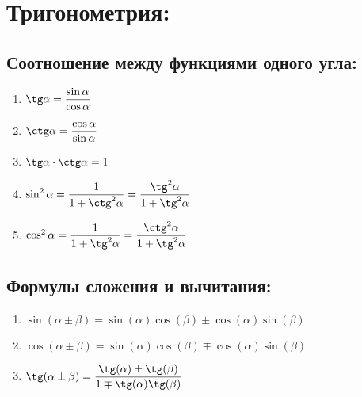 \documentclass[12pt, a4paper]{article}
\begin{document}
\section{Тригонометрия:}
\subsection{Соотношение между функциями одного угла:}
\begin{enumerate}
	\item $\tg \alpha =\displaystyle \frac{\sin \alpha}{\cos \alpha}	$
	\item $\ctg \alpha =\displaystyle \frac{\cos \alpha}{\sin \alpha}	$
	\item $\tg \alpha \cdot \ctg \alpha = 1$
	\item $\sin^2 \alpha = \displaystyle \frac{1}{1+\ctg^2 \alpha}=\frac{\tg^2 \alpha}{1+\tg^2 \alpha} $
	\item $\cos^2 \alpha = \displaystyle \frac{1}{1+\tg^2 \alpha}=\frac{\ctg^2 \alpha}{1+\tg^2 \alpha} $
\end{enumerate}
\subsection{Формулы сложения и вычитания:}
\begin{enumerate}
	\item $\sin(\alpha\pm\beta) = \sin(\alpha)\cos(\beta)\pm\cos(\alpha)\sin(\beta)$
	\item $\cos(\alpha\pm\beta) = \sin(\alpha)\cos(\beta)\mp\cos(\alpha)\sin(\beta)$
	\item $\tg(\alpha\pm\beta) = \displaystyle \frac{\tg(\alpha)\pm\tg(\beta)}{1\mp\tg(\alpha)\tg(\beta)}$
\end{enumerate}
\end{document}
